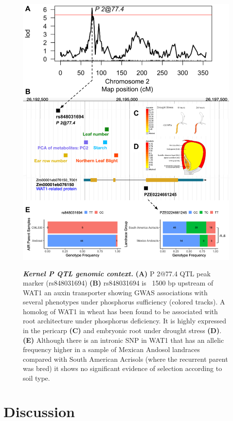 \begin{figure}[b]
\includegraphics[width=\linewidth]{Chapter-4/figs/WAT1.png}
\caption{}
\label{fig:WAT1}
\end{figure}

\clearpage

\addtocounter{figure}{-1}
\begin{figure} [t!]
  \caption[Kernel Phosphorus QTL genomic context]{\textit{\textbf{Kernel P QTL genomic context.}} \textbf{(A)} P 2@77.4 QTL peak marker (rs848031694)
  \textbf{(B)} rs848031694 is ~1500 bp upstream of WAT1 an auxin transporter showing GWAS associations with several phenotypes under phosphorus sufficiency (colored tracks). A homolog of WAT1 in wheat has been found to be associated with root architecture under phosphorus deficiency. It is highly expressed in the pericarp \textbf{(C)} and embryonic root under drought stress \textbf{(D)}.
  \textbf{(E)} Although there is an intronic SNP in WAT1 that has an allelic frequency higher in a sample of Mexican Andosol landraces compared with  South American Acrisols (where the recurrent parent was bred) it shows no significant evidence of selection according to soil type.}
\end{figure}

\section{Discussion}

\printbibliography[heading=subbibintoc, title=References]
